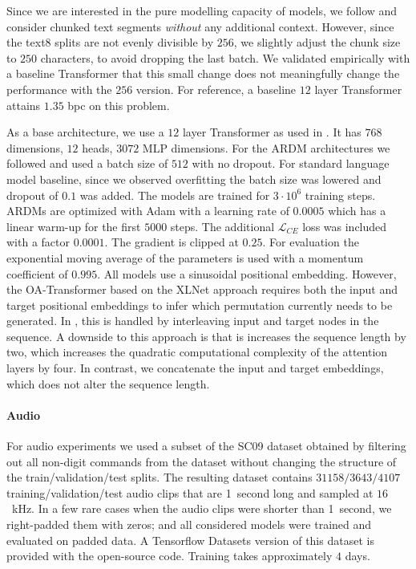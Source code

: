 \documentclass{article} \usepackage{iclr2022_conference,times}
\begin{document}
Since we are interested in the pure modelling capacity of models, we follow \citep{hoogeboom2021argmaxflows, austin2021structured} and consider chunked text segments \textit{without} any additional context. However, since the text8 splits are not evenly divisible by $256$, we slightly adjust the chunk size to $250$ characters, to avoid dropping the last batch. We validated empirically with a baseline Transformer that this small change does not meaningfully change the performance with the $256$ version. For reference, a baseline $12$ layer Transformer attains $1.35$ bpc on this problem. 

As a base architecture, we use a $12$ layer Transformer as used in \citep{austin2021structured}. It has $768$ dimensions, $12$ heads, $3072$ MLP dimensions. For the ARDM architectures we followed \citep{austin2021structured} and used a batch size of $512$ with no dropout. For standard language model baseline, since we observed overfitting the batch size was lowered and dropout of $0.1$ was added. The models are trained for $3 \cdot 10^6$ training steps. ARDMs are optimized with Adam with a learning rate of $0.0005$ which has a linear warm-up for the first $5000$ steps. The additional $\mathcal{L}_{CE}$ loss was included with a factor $0.0001$. The gradient is clipped at $0.25$. For evaluation the exponential moving average of the parameters is used with a momentum coefficient of $0.995$. All models use a sinusoidal positional embedding. However, the OA-Transformer based on the XLNet approach \citep{yang2019xlnet} requires both the input and target positional embeddings to infer which permutation currently needs to be generated. In \citep{alcorn2021DEformer}, this is handled by interleaving input and target nodes in the sequence. A downside to this approach is that is increases the sequence length by two, which increases the quadratic computational complexity of the attention layers by four. In contrast, we concatenate the input and target embeddings, which does not alter the sequence length.


\paragraph{Audio}
For audio experiments we used a subset of the SC09 dataset \citep{speechcommandsv2} obtained by filtering out all non-digit commands from the dataset without changing the structure of the train/validation/test splits. The resulting dataset contains $31158/3643/4107$ training/validation/test audio clips that are 1~second long and sampled at $16$~kHz. In a few rare cases when the audio clips were shorter than 1~second, we right-padded them with zeros; and all considered models were trained and evaluated on padded data. A Tensorflow Datasets \cite{TFDS} version of this dataset is provided with the open-source code. Training takes approximately $4$ days.
\end{document}
